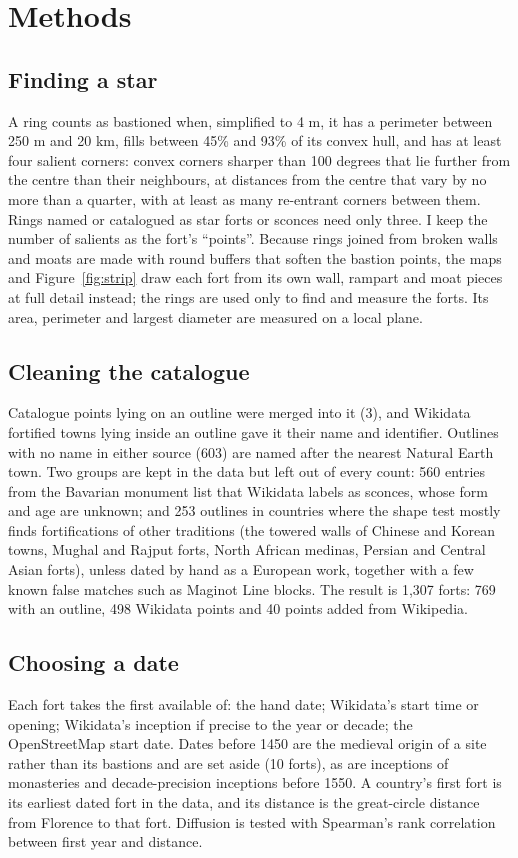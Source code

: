 \documentclass[11pt,a4paper]{article}
\begin{document}
\section{Methods}\label{sec:methods}
\subsection{Finding a star}
A ring counts as bastioned when, simplified to 4 m, it has a perimeter between 250 m and 20 km, fills between 45\% and 93\% of its convex hull, and has at least four salient corners: convex corners sharper than 100 degrees that lie further from the centre than their neighbours, at distances from the centre that vary by no more than a quarter, with at least as many re-entrant corners between them. Rings named or catalogued as star forts or sconces need only three. I keep the number of salients as the fort's ``points''. Because rings joined from broken walls and moats are made with round buffers that soften the bastion points, the maps and Figure~\ref{fig:strip} draw each fort from its own wall, rampart and moat pieces at full detail instead; the rings are used only to find and measure the forts. Its area, perimeter and largest diameter are measured on a local plane.

\subsection{Cleaning the catalogue}
Catalogue points lying on an outline were merged into it (3), and Wikidata fortified towns lying inside an outline gave it their name and identifier. Outlines with no name in either source (603) are named after the nearest Natural Earth town. Two groups are kept in the data but left out of every count: 560 entries from the Bavarian monument list that Wikidata labels as sconces, whose form and age are unknown; and 253 outlines in countries where the shape test mostly finds fortifications of other traditions (the towered walls of Chinese and Korean towns, Mughal and Rajput forts, North African medinas, Persian and Central Asian forts), unless dated by hand as a European work, together with a few known false matches such as Maginot Line blocks. The result is 1,307 forts: 769 with an outline, 498 Wikidata points and 40 points added from Wikipedia.

\subsection{Choosing a date}
Each fort takes the first available of: the hand date; Wikidata's start time or opening; Wikidata's inception if precise to the year or decade; the OpenStreetMap start date. Dates before 1450 are the medieval origin of a site rather than its bastions and are set aside (10 forts), as are inceptions of monasteries and decade-precision inceptions before 1550. A country's first fort is its earliest dated fort in the data, and its distance is the great-circle distance from Florence to that fort. Diffusion is tested with Spearman's rank correlation between first year and distance.
\end{document}
